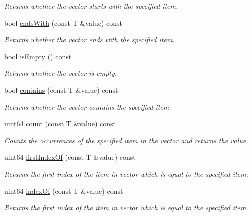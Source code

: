 \begin{DoxyCompactItemize}
\begin{DoxyCompactList}\small\item\em Returns whether the vector starts with the specified item. \end{DoxyCompactList}\item 
bool \mbox{\hyperlink{class_a_vector_a9cae5f201ad8fb74850f1d1dc2d044cc}{ends\+With}} (const T \&value) const
\begin{DoxyCompactList}\small\item\em Returns whether the vector ends with the specified item. \end{DoxyCompactList}\item 
\mbox{\label{class_a_vector_a66aa4c45a9c4126a0e97d225add9047a}} 
bool \mbox{\hyperlink{class_a_vector_a66aa4c45a9c4126a0e97d225add9047a}{is\+Empty}} () const
\begin{DoxyCompactList}\small\item\em Returns whether the vector is empty. \end{DoxyCompactList}\item 
bool \mbox{\hyperlink{class_a_vector_ab49821902c6048beab9de0e355baa386}{contains}} (const T \&value) const
\begin{DoxyCompactList}\small\item\em Returns whether the vector contains the specified item. \end{DoxyCompactList}\item 
uint64 \mbox{\hyperlink{class_a_vector_aa7ffcbc3145155967e6e18cacc3a0dcc}{count}} (const T \&value) const
\begin{DoxyCompactList}\small\item\em Counts the occurrences of the specified item in the vector and returns the value. \end{DoxyCompactList}\item 
uint64 \mbox{\hyperlink{class_a_vector_aa8a2735af0f9799c1537d0536ca4f69f}{first\+Index\+Of}} (const T \&value) const
\begin{DoxyCompactList}\small\item\em Returns the first index of the item in vector which is equal to the specified item. \end{DoxyCompactList}\item 
uint64 \mbox{\hyperlink{class_a_vector_a81ee68969c55a70a2215e996e2d53027}{index\+Of}} (const T \&value) const
\begin{DoxyCompactList}\small\item\em Returns the first index of the item in vector which is equal to the specified item. \end{DoxyCompactList}\item 

\end{DoxyCompactItemize}
